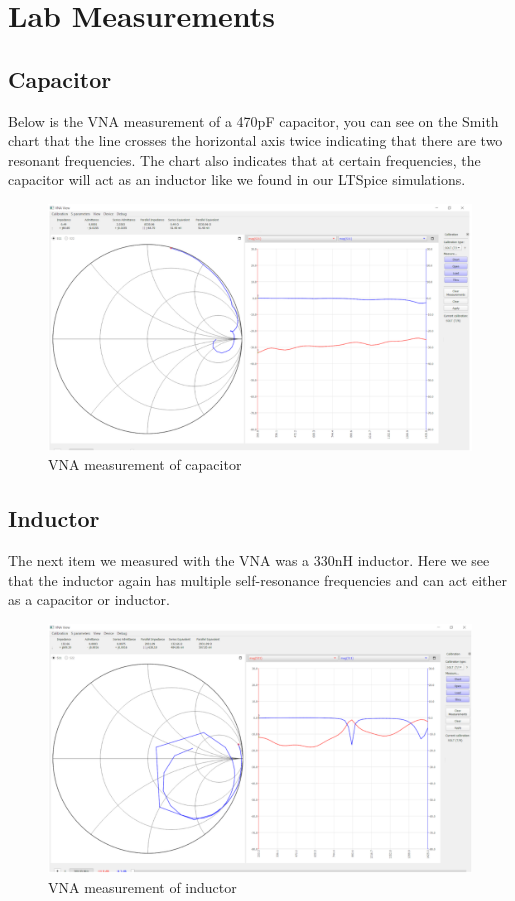 \documentclass[12pt]{article}
\begin{document}
\section*{Lab Measurements}
\subsection*{Capacitor}
Below is the VNA measurement of a 470pF capacitor, you can see on the Smith chart that the line crosses the horizontal axis twice indicating that there are two resonant frequencies. The chart also indicates that at certain frequencies, the capacitor will act as an inductor like we found in our LTSpice simulations. 
\begin{figure}[h!]
\centering
\includegraphics[width=12cm]{assets/cap_measurement.png}
\caption{VNA measurement of capacitor}
\end{figure}
\subsection*{Inductor}
The next item we measured with the VNA was a 330nH inductor. Here we see that the inductor again has multiple self-resonance frequencies and can act either as a capacitor or inductor.  
\begin{figure}[h]
\centering
\includegraphics[width=12cm]{assets/ind_measurement.png}
\caption{VNA measurement of inductor}
\end{figure}
\end{document}
